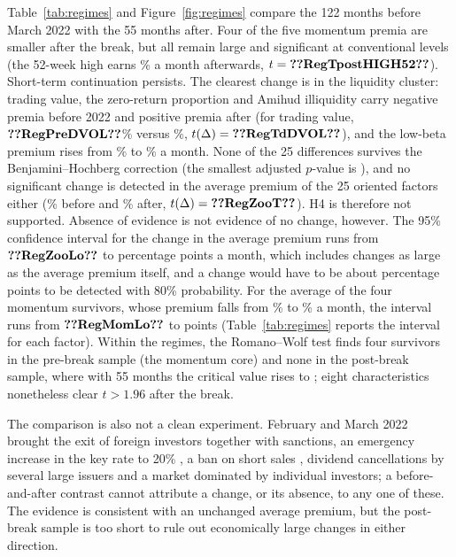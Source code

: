 \documentclass[11pt]{article}
\newcommand{\RW}{Romano--Wolf}
\begin{document}
Table~\ref{tab:regimes} and Figure~\ref{fig:regimes} compare the 122 months before March 2022 with the 55 months after.
Four of the five momentum premia are smaller after the break, but all remain large and significant at
conventional levels (the 52-week high earns \% a month afterwards, $t=\val{RegTpostHIGH52}$). Short-term continuation
persists. The clearest change is in the liquidity cluster: trading value, the zero-return proportion and Amihud
illiquidity carry negative premia before 2022 and positive premia after (for trading value, $\val{RegPreDVOL}$\% versus
\%, $t(\Delta)=\val{RegTdDVOL}$), and the low-beta premium rises from \% to
\% a month. None of the 25 differences survives
the Benjamini--Hochberg correction (the smallest adjusted $p$-value is ), and no significant change is
detected in the average premium of the 25 oriented factors either (\% before and \% after,
$t(\Delta)=\val{RegZooT}$). H4 is therefore not supported. Absence of evidence is not evidence of no change, however.
The 95\% confidence interval for the change in the average premium runs from $\val{RegZooLo}$ to 
percentage points a month, which includes changes as large as the average premium itself, and a change would have to be
about  percentage points to be detected with 80\% probability. For the average of the four momentum
survivors, whose premium falls from \% to \% a month, the interval runs from
$\val{RegMomLo}$ to  points (Table~\ref{tab:regimes} reports the interval for each factor). Within the
regimes, the \RW{} test finds four survivors in the pre-break sample (the momentum core) and none in the post-break
sample, where with 55 months the critical value rises to ; eight characteristics nonetheless clear
$t>1.96$ after the break.

The comparison is also not a clean experiment. February and March 2022 brought the exit of foreign investors together
with sanctions, an emergency increase in the key rate to 20\% \citep{cbr2022keyrate}, a ban on short sales
\citep{cbr2022shortban}, dividend cancellations by several large issuers and a market dominated by individual
investors; a before-and-after contrast cannot attribute a change, or its absence, to any one of these. The evidence is
consistent with an unchanged average premium, but the post-break sample is too short to rule out economically large
changes in either direction.
\end{document}
